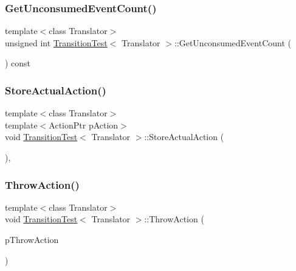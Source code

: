 \subsubsection{\texorpdfstring{Get\+Unconsumed\+Event\+Count()}{GetUnconsumedEventCount()}}
{\footnotesize\ttfamily template$<$class Translator$>$ \\
unsigned int \mbox{\hyperlink{struct_transition_test}{Transition\+Test}}$<$ Translator $>$\+::Get\+Unconsumed\+Event\+Count (\begin{DoxyParamCaption}{ }\end{DoxyParamCaption}) const\hspace{0.3cm}{\ttfamily [inline]}}

\mbox{\label{struct_transition_test_a8472d08be7c0daef4353e7d4b3f36a08}} 
\subsubsection{\texorpdfstring{Store\+Actual\+Action()}{StoreActualAction()}}
{\footnotesize\ttfamily template$<$class Translator$>$ \\
template$<$Action\+Ptr p\+Action$>$ \\
void \mbox{\hyperlink{struct_transition_test}{Transition\+Test}}$<$ Translator $>$\+::Store\+Actual\+Action (\begin{DoxyParamCaption}{ }\end{DoxyParamCaption})\hspace{0.3cm}{\ttfamily [inline]}, {\ttfamily [private]}}

\mbox{\label{struct_transition_test_a75cec2df43a48dc581d59402eefd7fba}} 
\subsubsection{\texorpdfstring{Throw\+Action()}{ThrowAction()}}
{\footnotesize\ttfamily template$<$class Translator$>$ \\
void \mbox{\hyperlink{struct_transition_test}{Transition\+Test}}$<$ Translator $>$\+::Throw\+Action (\begin{DoxyParamCaption}\item[{\mbox{\hyperlink{_transition_test_8cpp_a15abe0c263cd39ad777035499160b924}{Action\+Ptr}}}]{p\+Throw\+Action }\end{DoxyParamCaption})\hspace{0.3cm}{\ttfamily [inline]}}

